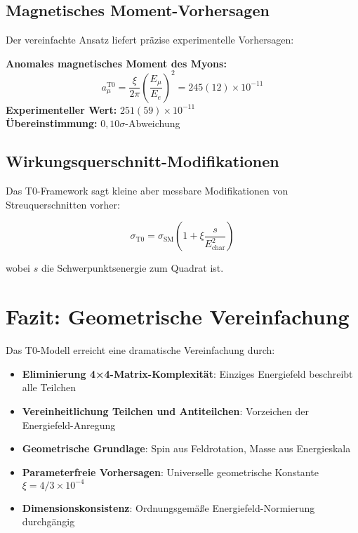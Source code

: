 \documentclass[12pt,a4paper]{report}
\begin{document}
	\subsection{Magnetisches Moment-Vorhersagen}
	\label{subsec:magnetic_moment_predictions}
	
	Der vereinfachte Ansatz liefert präzise experimentelle Vorhersagen:
	
	\textbf{Anomales magnetisches Moment des Myons:}
	\begin{equation}
		a_\mu^{\text{T0}} = \frac{\xi}{2\pi} \left(\frac{E_\mu}{E_e}\right)^2 = 245(12) \times 10^{-11}
	\end{equation}
	\textbf{Experimenteller Wert:} $251(59) \times 10^{-11}$ \\
	\textbf{Übereinstimmung:} $0,10\sigma$-Abweichung
	
	\subsection{Wirkungsquerschnitt-Modifikationen}
	\label{subsec:cross_section_modifications}
	
	Das T0-Framework sagt kleine aber messbare Modifikationen von Streuquerschnitten vorher:
	
	\begin{equation}
		\sigma_{\text{T0}} = \sigma_{\text{SM}} \left(1 + \xi \frac{s}{E_{\text{char}}^2}\right)
	\end{equation}
	
	wobei $s$ die Schwerpunktsenergie zum Quadrat ist.
	
	\section{Fazit: Geometrische Vereinfachung}
	\label{sec:conclusion}
	
	Das T0-Modell erreicht eine dramatische Vereinfachung durch:
	
	\begin{itemize}
		\item \textbf{Eliminierung 4×4-Matrix-Komplexität}: Einziges Energiefeld beschreibt alle Teilchen
		\item \textbf{Vereinheitlichung Teilchen und Antiteilchen}: Vorzeichen der Energiefeld-Anregung
		\item \textbf{Geometrische Grundlage}: Spin aus Feldrotation, Masse aus Energieskala
		\item \textbf{Parameterfreie Vorhersagen}: Universelle geometrische Konstante $\xi = 4/3 \times 10^{-4}$
		\item \textbf{Dimensionskonsistenz}: Ordnungsgemäße Energiefeld-Normierung durchgängig
	\end{itemize}
	
\end{document}
